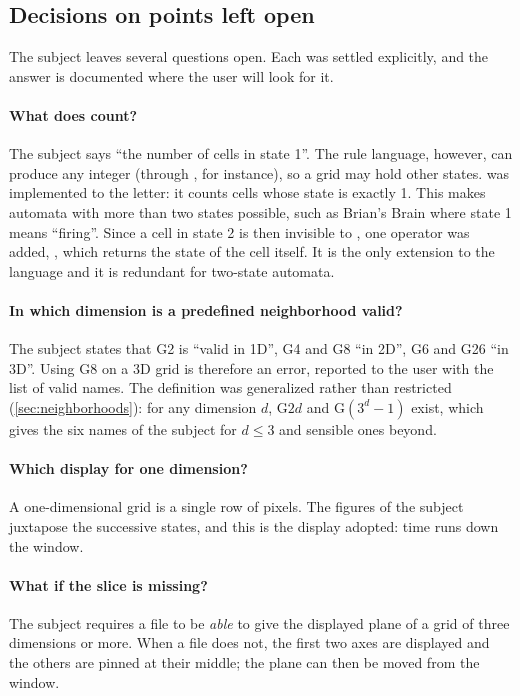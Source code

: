 \subsection{Decisions on points left open}

The subject leaves several questions open. Each was settled explicitly, and the answer is
documented where the user will look for it.

\paragraph{What does  count?} The subject says ``the number of cells in state 1''.
The rule language, however, can produce any integer (through , for instance), so a
grid may hold other states.  was implemented to the letter: it counts cells whose
state is exactly 1. This makes automata with more than two states possible, such as Brian's
Brain where state 1 means ``firing''. Since a cell in state 2 is then invisible to
, one operator was added, , which returns the state of the cell
itself. It is the only extension to the language and it is redundant for two-state automata.

\paragraph{In which dimension is a predefined neighborhood valid?} The subject states that G2
is ``valid in 1D'', G4 and G8 ``in 2D'', G6 and G26 ``in 3D''. Using G8 on a 3D grid is therefore
an error, reported to the user with the list of valid names. The definition was generalized
rather than restricted (\cref{sec:neighborhoods}): for any dimension $d$, G$2d$ and G$(3^d-1)$
exist, which gives the six names of the subject for $d \le 3$ and sensible ones beyond.

\paragraph{Which display for one dimension?} A one-dimensional grid is a single row of pixels.
The figures of the subject juxtapose the successive states, and this is the display adopted:
time runs down the window.

\paragraph{What if the slice is missing?} The subject requires a file to be \emph{able} to give
the displayed plane of a grid of three dimensions or more. When a file does not, the first two
axes are displayed and the others are pinned at their middle; the plane can then be moved from
the window.

